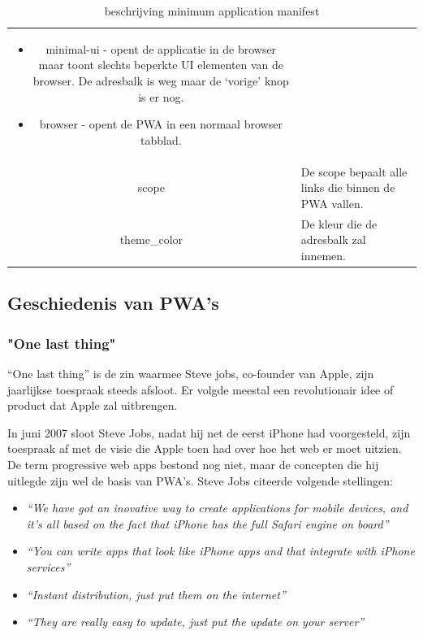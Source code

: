 \begin{table}[H]
\begin{tabular}{cp{12cm}}
\begin{itemize}
			     		  \item minimal-ui - opent de applicatie in de browser maar toont slechts beperkte UI elementen van de browser. De adresbalk is weg maar de ‘vorige’ knop is er nog.
			     		  \item browser - opent de PWA in een normaal browser tabblad.
		     		\end{itemize} \\
	     		scope & De scope bepaalt alle links die binnen de PWA vallen. \\
	     		theme\_color & De kleur die de adresbalk zal innemen.
			\end{tabular}	
			\caption{beschrijving minimum application manifest}
		\end{table}
				
			
	
	
	\autocite{LePage2020}

\subsection{Geschiedenis van PWA's}

	\subsubsection{"One last thing"}

		 “One last thing” is de zin waarmee Steve jobs, co-founder van Apple, zijn jaarlijkse toespraak steeds afsloot. Er volgde meestal een revolutionair idee of product dat Apple zal uitbrengen.
		
		In juni 2007 sloot Steve Jobs, nadat hij net de eerst iPhone had voorgesteld, zijn toespraak af met de visie die Apple toen had over hoe het web er moet uitzien. De term progressive web apps bestond nog niet, maar de concepten die hij uitlegde zijn wel de basis van PWA's. Steve Jobs citeerde volgende stellingen:
	
		
		\begin{itemize}
			\item \textit{ “We have got an inovative way to create applications for mobile devices, and it’s all based on the fact that iPhone has the full Safari engine on board”}
			\item \textit{“You can write apps that look like iPhone apps and that integrate with iPhone services”}
			\item \textit{“Instant distribution, just put them on the internet”}
			\item \textit{“They are really easy to update, just put the update on your server”}
		\end{itemize}
		\autocite{Jobs2007}
		
